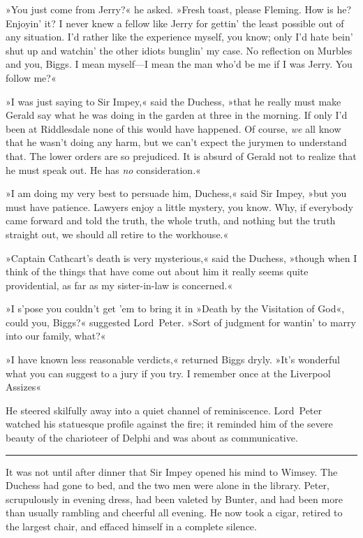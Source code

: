 »You just come from Jerry?« he asked. »Fresh toast, please Fleming. How is he? Enjoyin' it? I never knew a fellow like Jerry for gettin' the least possible out of any situation. I'd rather like the experience myself, you know; only I'd hate bein' shut up and watchin' the other idiots bunglin' my case. No reflection on Murbles and you, Biggs. I mean myself—I mean the man who'd be me if I was Jerry. You follow me?«

»I was just saying to Sir Impey,« said the Duchess, »that he really must make Gerald say what he was doing in the garden at three in the morning. If only I'd been at Riddlesdale none of this would have happened. Of course, \textit{we} all know that he wasn't doing any harm, but we can't expect the jurymen to understand that. The lower orders are so prejudiced. It is absurd of Gerald not to realize that he must speak out. He has \textit{no} consideration.«

»I am doing my very best to persuade him, Duchess,« said Sir Impey, »but you must have patience. Lawyers enjoy a little mystery, you know.  Why, if everybody came forward and told the truth, the whole truth, and nothing but the truth straight out, we should all retire to the workhouse.«

»Captain Cathcart's death is very mysterious,« said the Duchess, »though when I think of the things that have come out about him it really seems quite providential, as far as my sister-in-law is concerned.«

»I s'pose you couldn't get 'em to bring it in »Death by the Visitation of God«, could you, Biggs?« suggested Lord~Peter. »Sort of judgment for wantin' to marry into our family, what?«

»I have known less reasonable verdicts,« returned Biggs dryly. »It's wonderful what you can suggest to a jury if you try. I remember once at the Liverpool Assizes\longdash«

He steered skilfully away into a quiet channel of reminiscence. Lord~Peter watched his statuesque profile against the fire; it reminded him of the severe beauty of the charioteer of Delphi and was about as communicative.

\noindent\hfil\rule{0.5\textwidth}{.4pt}\hfil

It was not until after dinner that Sir Impey opened his mind to Wimsey.  The Duchess had gone to bed, and the two men were alone in the library.  Peter, scrupulously in evening dress, had been valeted by Bunter, and had been more than usually rambling and cheerful all evening. He now took a cigar, retired to the largest chair, and effaced himself in a complete silence.

